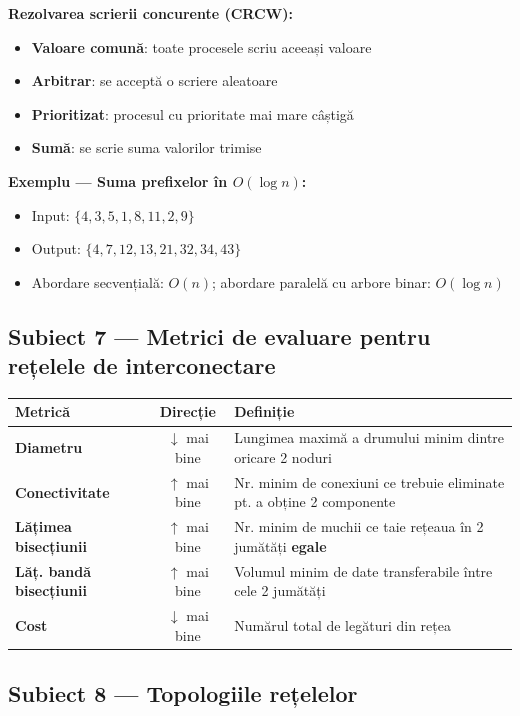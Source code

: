 \documentclass[a4paper,11pt]{article}
\newcommand{\thead}[1]{\cellcolor{tblh}\color{white}\textbf{#1}}
\newcommand{\subiect}[2]{\subsection{Subiect \textcolor{numcol}{#1} — #2}}
\begin{document}
\textbf{Rezolvarea scrierii concurente (CRCW):}
\begin{itemize}[noitemsep]
  \item \textbf{Valoare comună}: toate procesele scriu aceeași valoare
  \item \textbf{Arbitrar}: se acceptă o scriere aleatoare
  \item \textbf{Prioritizat}: procesul cu prioritate mai mare câștigă
  \item \textbf{Sumă}: se scrie suma valorilor trimise
\end{itemize}

\textbf{Exemplu — Suma prefixelor în $O(\log n)$:}
\begin{itemize}[noitemsep]
  \item Input: $\{4, 3, 5, 1, 8, 11, 2, 9\}$
  \item Output: $\{4, 7, 12, 13, 21, 32, 34, 43\}$
  \item Abordare secvențială: $O(n)$; abordare paralelă cu arbore binar: $O(\log n)$
\end{itemize}

\subiect{7}{Metrici de evaluare pentru rețelele de interconectare}

\begin{center}
\begin{tabular}{lcp{8cm}}
\toprule
\thead{Metrică} & \thead{Direcție} & \thead{Definiție} \\
\midrule
\textbf{Diametru} & $\downarrow$ mai bine & Lungimea maximă a drumului minim dintre oricare 2 noduri \\
\textbf{Conectivitate} & $\uparrow$ mai bine & Nr. minim de conexiuni ce trebuie eliminate pt. a obține 2 componente \\
\textbf{Lățimea bisecțiunii} & $\uparrow$ mai bine & Nr. minim de muchii ce taie rețeaua în 2 jumătăți \textbf{egale} \\
\textbf{Lăț. bandă bisecțiunii} & $\uparrow$ mai bine & Volumul minim de date transferabile între cele 2 jumătăți \\
\textbf{Cost} & $\downarrow$ mai bine & Numărul total de legături din rețea \\
\bottomrule
\end{tabular}
\end{center}

\subiect{8}{Topologiile rețelelor}
\end{document}
